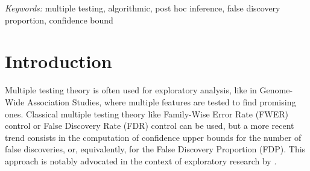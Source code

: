 \documentclass[
  11pt,
  a4paper,
]{article}
\renewcommand*\contentsname{Table of contents}
\newcommand\contentsname{Table of contents}
\theoremstyle{plain}
\theoremstyle{definition}
\theoremstyle{plain}
\theoremstyle{definition}
\theoremstyle{plain}
\theoremstyle{remark}
\begin{document}
\noindent%
{\it Keywords:} multiple testing, algorithmic, post hoc inference, false
discovery proportion, confidence bound
\vfill

\linenumbers
{}


\renewcommand*\contentsname{Contents}
{
\hypersetup{linkcolor=}
\setcounter{tocdepth}{3}
\tableofcontents
}
\newcommand{\comp}[1]{{#1}^{\mathsf{c}}}
 \newcommand{\Pro}[1]{\mathbb{P}\left(#1\right)} 
 \newcommand{\Esp}[1]{\mathbb{E}\left[ #1 \right]}
 \newcommand{\ind}[1]{\mathbb{1}_{\left\{#1 \right\}}}
 \newcommand{\cH}{\mathcal{H}}
 \newcommand{\cK}{\mathcal{K}}
 \newcommand{\cP}{\mathcal{P}}
 \newcommand{\FDP}{\mathrm{FDP}}
 \newcommand{\FDR}{\mathrm{FDR}}
 \newcommand{\JER}{\mathrm{JER}}
 \newcommand{\Rfam}{\mathfrak{R}}
 \newcommand{\statfam}{\mathfrak{F}}
 \newcommand{\Hoi}{H_{0,i}}
 \newcommand{\Vhat}{\widehat V}
 \newcommand{\Vstar}{V^*_{\Rfam}}
 \newcommand{\Nm}{\mathbb{N}_m}
 \newcommand{\pr}{\mathfrak{pr}}
 \newcommand{\kth}[2]{k^{(#1,#2)}}
 \newcommand{\RR}{\mathbb{R}}
 \newcommand{\telque}{\,:\,}

\section{Introduction}\label{introduction}

Multiple testing theory is often used for exploratory analysis, like in
Genome-Wide Association Studies, where multiple features are tested to
find promising ones. Classical multiple testing theory like Family-Wise
Error Rate (FWER) control or False Discovery Rate (FDR) control
\citep{MR1325392} can be used, but a more recent trend consists in the
computation of confidence upper bounds for the number of false
discoveries, or, equivalently, for the False Discovery Proportion (FDP).
This approach is notably advocated in the context of exploratory
research by \citep[Section 1]{MR2951390}.
\end{document}
